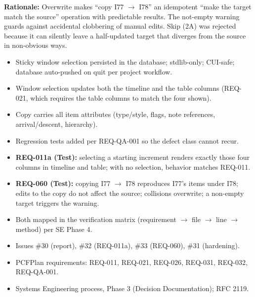 {\begin{enumerate}
\textbf{Rationale:} Overwrite makes ``copy I77 $\rightarrow$ I78'' an idempotent
``make the target match the source'' operation with predictable results. The
not-empty warning guards against accidental clobbering of manual edits. Skip (2A)
was rejected because it can silently leave a half-updated target that diverges
from the source in non-obvious ways.


\begin{itemize}
    \item Sticky window selection persisted in the database; stdlib-only; CUI-safe;
    database auto-pushed on quit per project workflow.
    \item Window selection updates both the timeline and the table columns
    (REQ-021, which requires the table columns to match the four shown).
    \item Copy carries all item attributes (type/style, flags, note references,
    arrival/descent, hierarchy).
    \item Regression tests added per REQ-QA-001 so the defect class cannot recur.
\end{itemize}


\begin{itemize}
    \item \textbf{REQ-011a (Test):} selecting a starting increment renders exactly
    those four columns in timeline and table; with no selection, behavior matches
    REQ-011.
    \item \textbf{REQ-060 (Test):} copying I77 $\rightarrow$ I78 reproduces I77's
    items under I78; edits to the copy do not affect the source; collisions
    overwrite; a non-empty target triggers the warning.
    \item Both mapped in the verification matrix (requirement $\rightarrow$ file
    $\rightarrow$ line $\rightarrow$ method) per SE Phase 4.
\end{itemize}


\begin{itemize}
    \item Issues \#30 (report), \#32 (REQ-011a), \#33 (REQ-060), \#31 (hardening).
    \item PCFPlan requirements: REQ-011, REQ-021, REQ-026, REQ-031, REQ-032, REQ-QA-001.
    \item Systems Engineering process, Phase 3 (Decision Documentation); RFC 2119.
\end{itemize}

\end{enumerate}
}


